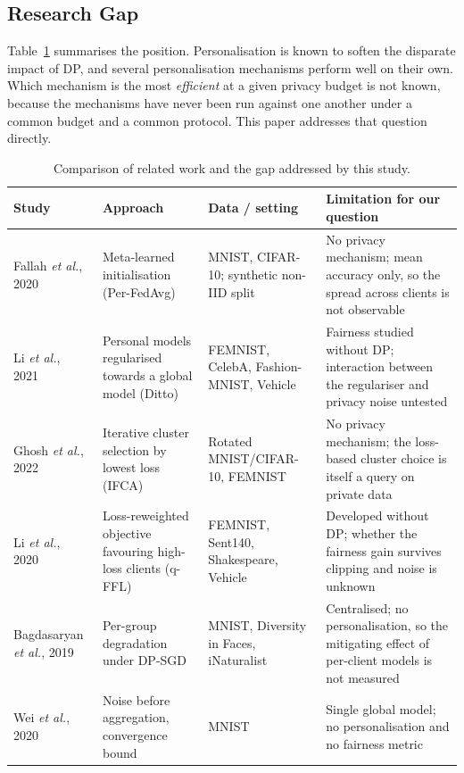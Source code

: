 \subsection{Research Gap}
Table~\ref{tab:related} summarises the position. Personalisation is known to soften the disparate impact of DP, and
several personalisation mechanisms perform well on their own. Which mechanism is the most \emph{efficient} at a
given privacy budget is not known, because the mechanisms have never been run against one another under a common
budget and a common protocol. This paper addresses that question directly.

\begin{table}[!t]
\caption{Comparison of related work and the gap addressed by this study.}
\label{tab:related}
\centering
\footnotesize
\begin{tabular}{p{2.6cm}p{4.0cm}p{3.2cm}p{6.6cm}}
\toprule
Study & Approach & Data / setting & Limitation for our question \\
\midrule
Fallah \emph{et al.}, 2020~\cite{fallah2020personalized} & Meta-learned initialisation (Per-FedAvg) & MNIST, CIFAR-10; synthetic non-IID split & No privacy mechanism; mean accuracy only, so the spread across clients is not observable \\
Li \emph{et al.}, 2021~\cite{li2021ditto} & Personal models regularised towards a global model (Ditto) & FEMNIST, CelebA, Fashion-MNIST, Vehicle & Fairness studied without DP; interaction between the regulariser and privacy noise untested \\
Ghosh \emph{et al.}, 2022~\cite{ghosh2022efficient} & Iterative cluster selection by lowest loss (IFCA) & Rotated MNIST/CIFAR-10, FEMNIST & No privacy mechanism; the loss-based cluster choice is itself a query on private data \\
Li \emph{et al.}, 2020~\cite{li2020fair} & Loss-reweighted objective favouring high-loss clients (q-FFL) & FEMNIST, Sent140, Shakespeare, Vehicle & Developed without DP; whether the fairness gain survives clipping and noise is unknown \\
Bagdasaryan \emph{et al.}, 2019~\cite{bagdasaryan2019differential} & Per-group degradation under DP-SGD & MNIST, Diversity in Faces, iNaturalist & Centralised; no personalisation, so the mitigating effect of per-client models is not measured \\
Wei \emph{et al.}, 2020~\cite{wei2020federated} & Noise before aggregation, convergence bound & MNIST & Single global model; no personalisation and no fairness metric \\

\end{tabular}
\end{table}
